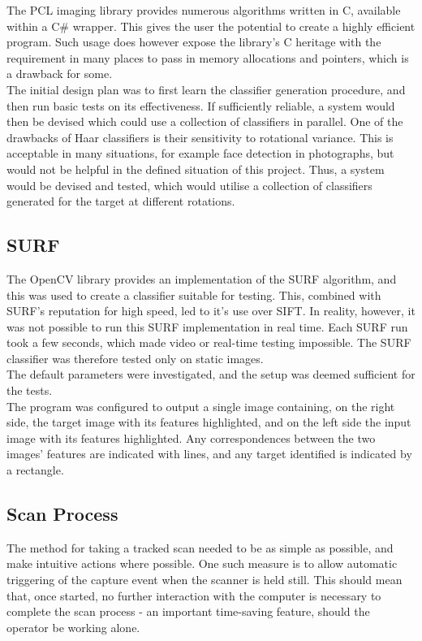 The PCL imaging library provides numerous algorithms written in C, available within a C# wrapper. This gives the user the potential to create a highly efficient program. Such usage does however expose the library’s C heritage with the requirement in many places to pass in memory allocations and pointers, which is a drawback for some. \\

The initial design plan was to first learn the classifier generation procedure, and then run basic tests on its effectiveness. If sufficiently reliable, a system would then be devised which could use a collection of classifiers in parallel. One of the drawbacks of Haar classifiers is their sensitivity to rotational variance. This is acceptable in many situations, for example face detection in photographs, but would not be helpful in the defined situation of this project. Thus, a system would be devised and tested, which would utilise a collection of classifiers generated for the target at different rotations.\\

\subsection{SURF}
The OpenCV library provides an implementation of the SURF algorithm, and this was used to create a classifier suitable for testing. This, combined with SURF's reputation for high speed, led to it's use over SIFT. In reality, however, it was not possible to run this SURF implementation in real time. Each SURF run took a few seconds, which made video or real-time testing impossible. The SURF classifier was therefore tested only on static images. \\

The default parameters were investigated, and the setup was deemed sufficient for the tests.\\

The program was configured to output a single image containing, on the right side, the target image with its features highlighted, and on the left side the input image with its features highlighted. Any correspondences between the two images’ features are indicated with lines, and any target identified is indicated by a rectangle.\\

\subsection{Scan Process}
The method for taking a tracked scan needed to be as simple as possible, and make intuitive actions where possible. One such measure is to allow automatic triggering of the capture event when the scanner is held still. This should mean that, once started, no further interaction with the computer is necessary to complete the scan process - an important time-saving feature, should the operator be working alone.\\

